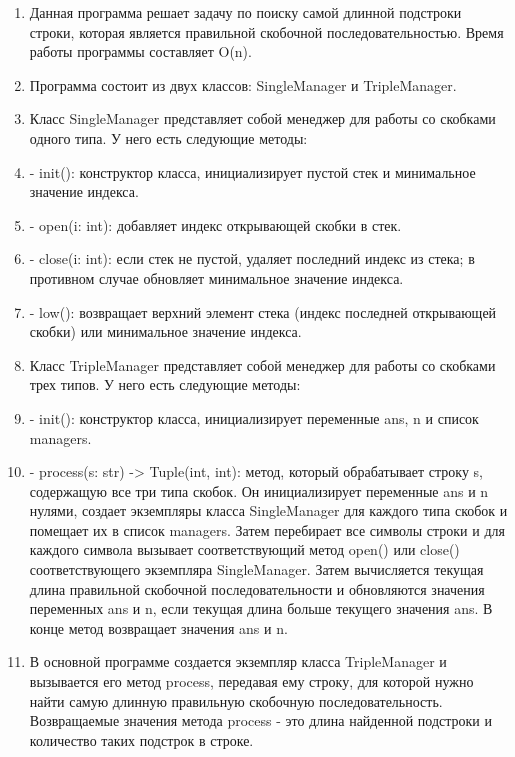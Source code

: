 \begin{enumerate}
	\item Данная программа решает задачу по поиску самой длинной подстроки строки, которая является правильной скобочной последовательностью. Время работы программы составляет O(n).

	\item Программа состоит из двух классов: SingleManager и TripleManager.
	
	\item Класс SingleManager представляет собой менеджер для работы со скобками одного типа. У него есть следующие методы:
	
	\item - init(): конструктор класса, инициализирует пустой стек и минимальное значение индекса.
	\item - open(i: int): добавляет индекс открывающей скобки в стек.
	\item - close(i: int): если стек не пустой, удаляет последний индекс из стека; в противном случае обновляет минимальное значение индекса.
	\item - low(): возвращает верхний элемент стека (индекс последней открывающей скобки) или минимальное значение индекса.
	
	\item Класс TripleManager представляет собой менеджер для работы со скобками трех типов. У него есть следующие методы:
	
	\item - init(): конструктор класса, инициализирует переменные ans, n и список managers.
	\item - process(s: str) -> Tuple(int, int): метод, который обрабатывает строку s, содержащую все три типа скобок. Он инициализирует переменные ans и n нулями, создает экземпляры класса SingleManager для каждого типа скобок и помещает их в список managers. Затем перебирает все символы строки и для каждого символа вызывает соответствующий метод open() или close() соответствующего экземпляра SingleManager. Затем вычисляется текущая длина правильной скобочной последовательности и обновляются значения переменных ans и n, если текущая длина больше текущего значения ans. В конце метод возвращает значения ans и n.
	
	\item В основной программе создается экземпляр класса TripleManager и вызывается его метод process, передавая ему строку, для которой нужно найти самую длинную правильную скобочную последовательность. Возвращаемые значения метода process - это длина найденной подстроки и количество таких подстрок в строке.

\end{enumerate}